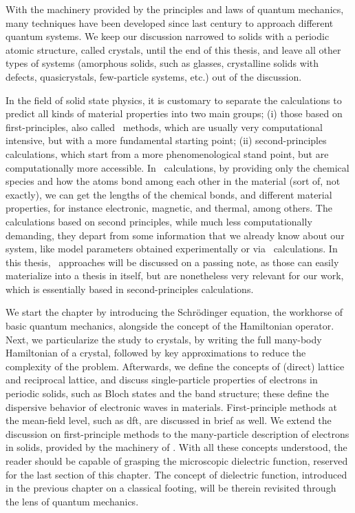 With the machinery provided by the principles and laws of quantum mechanics, many techniques have been developed since last century to approach different quantum systems.
We keep our discussion narrowed to solids with a periodic atomic structure, called crystals, until the end of this thesis, and leave all other types of systems (amorphous solids, such as glasses, crystalline solids with defects, quasicrystals, few-particle systems, etc.) out of the discussion.

In the field of solid state physics, it is customary to separate the calculations to predict all kinds of material properties into two main groups; (i) those based on first-principles, also called \abinit~methods, which are usually very computational intensive, but with a more fundamental starting point; (ii) second-principles calculations, which start from a more phenomenological stand point, but are computationally more accessible.
In \abinit~calculations, by providing only the chemical species and how the atoms bond among each other in the material (sort of, not exactly), we can get the lengths of the chemical bonds, and different material properties, for instance electronic, magnetic, and thermal, among others.
The calculations based on second principles, while much less computationally demanding, they depart from some information that we already know about our system, like model parameters obtained experimentally or via \abinit~calculations.
In this thesis, \abinit~approaches will be discussed on a passing note, as those can easily materialize into a thesis in itself, but are nonetheless very relevant for our work, which is essentially based in second-principles calculations.

We start the chapter by introducing the Schr\"{o}dinger equation, the workhorse of basic quantum mechanics, alongside the concept of the Hamiltonian operator.
Next, we particularize the study to crystals, by writing the full many-body Hamiltonian of a crystal, followed by key approximations to reduce the complexity of the problem.
Afterwards, we define the concepts of (direct) lattice and reciprocal lattice, and discuss single-particle properties of electrons in periodic solids, such as Bloch states and the band structure; these define the dispersive behavior of electronic waves in materials.
First-principle methods at the mean-field level, such as \gls{dft}, are discussed in brief as well.
We extend the discussion on first-principle methods to the many-particle description of electrons in solids, provided by the machinery of \mbpt.
With all these concepts understood, the reader should be capable of grasping the microscopic dielectric function, reserved for the last section of this chapter.
The concept of dielectric function, introduced in the previous chapter on a classical footing, will be therein revisited through the lens of quantum mechanics.


